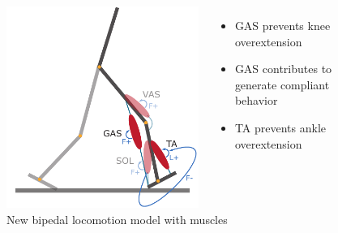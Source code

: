 \documentclass[10pt]{beamer}
\begin{document}
\begin{frame}
\begin{figure}
\begin{overprint}
				\begin{columns}
					\begin{column}{.5\textwidth}
						\includegraphics[height=.5\textheight]{images/new_model/stance/muscle_vas_sol_gas_ta.pdf} 
						\caption{New bipedal locomotion model with muscles}
					\end{column}
					\begin{column}{.5\textwidth}
						\begin{itemize}
							\item GAS prevents knee overextension  \\[1em]
							\item GAS contributes to generate compliant behavior \\[1em]
							\item TA prevents ankle overextension
						\end{itemize}
					\end{column}
				\end{columns}
				

\end{overprint}
\end{figure}
\end{frame}
\end{document}

